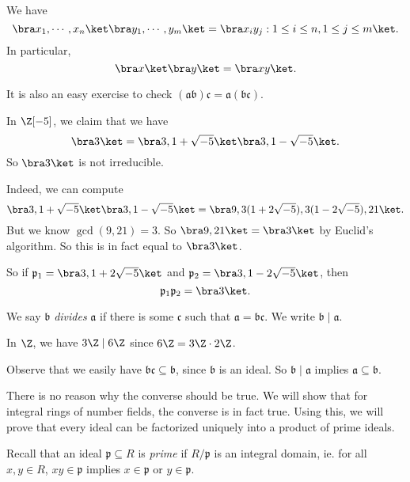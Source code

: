 \documentclass[a4paper]{article}
\begin{document}
\begin{eg}
  We have
  \[
    \bra x_1, \cdots, x_n\ket \bra y_1, \cdots, y_m\ket = \bra x_i y_j: 1 \leq i \leq n, 1 \leq j \leq m\ket.
  \]
  In particular,
  \[
    \bra x\ket \bra y\ket = \bra xy\ket.
  \]
\end{eg}
It is also an easy exercise to check $(\mathfrak{a}\mathfrak{b})\mathfrak{c} = \mathfrak{a}(\mathfrak{b}\mathfrak{c})$.

\begin{eg}
  In $\Z[-5]$, we claim that we have
  \[
    \bra 3\ket = \bra 3, 1 + \sqrt{-5}\ket \bra 3, 1 - \sqrt{-5}\ket.
  \]
  So $\bra 3\ket$ is not irreducible.

  Indeed, we can compute
  \[
    \bra 3, 1 + \sqrt{-5}\ket \bra 3, 1 - \sqrt{-5}\ket = \bra 9, 3(1 + 2\sqrt{-5}), 3(1 - 2\sqrt{-5}), 21\ket.
  \]
  But we know $\gcd(9, 21) = 3$. So $\bra 9, 21\ket = \bra 3\ket$ by Euclid's algorithm. So this is in fact equal to $\bra 3\ket$.

  So if $\mathfrak{p}_1 = \bra 3, 1 + 2\sqrt{-5}\ket$ and $\mathfrak{p}_2 = \bra 3, 1 - 2\sqrt{-5}\ket$, then
  \[
    \mathfrak{p}_1 \mathfrak{p}_2 = \bra 3\ket.
  \]
\end{eg}

\begin{defi}[Divisibility]
  We say $\mathfrak{b}$ \emph{divides} $\mathfrak{a}$ if there is some $\mathfrak{c}$ such that $\mathfrak{a} = \mathfrak{b}\mathfrak{c}$. We write $\mathfrak{b} \mid \mathfrak{a}$.
\end{defi}

\begin{eg}
  In $\Z$, we have $3\Z \mid 6\Z$ since $6\Z = 3\Z \cdot 2\Z$.
\end{eg}

Observe that we easily have $\mathfrak{b} \mathfrak{c} \subseteq \mathfrak{b}$, since $\mathfrak{b}$ is an ideal. So $\mathfrak{b} \mid \mathfrak{a}$ implies $\mathfrak{a} \subseteq \mathfrak{b}$.

There is no reason why the converse should be true. We will show that for integral rings of number fields, the converse is in fact true. Using this, we will prove that every ideal can be factorized uniquely into a product of prime ideals.

Recall that an ideal $\mathfrak{p} \subseteq R$ is \emph{prime} if $R/\mathfrak{p}$ is an integral domain, ie. for all $x, y \in R$, $xy \in \mathfrak{p}$ implies $x \in \mathfrak{p}$ or $y \in \mathfrak{p}$.
\end{document}
